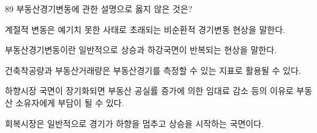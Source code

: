 \begin{question}{89}
부동산경기변동에 관한 설명으로 옳지 않은 것은?
\begin{choices}
  \item 계절적 변동은 예기치 못한 사태로 초래되는 비순환적 경기변동 현상을 말한다.
  \item 부동산경기변동이란 일반적으로 상승과 하강국면이 반복되는 현상을 말한다.
  \item 건축착공량과 부동산거래량은 부동산경기를 측정할 수 있는 지표로 활용될 수 있다.
  \item 하향시장 국면이 장기화되면 부동산 공실률 증가에 의한 임대료 감소 등의 이유로 부동산 소유자에게 부담이 될 수 있다.
  \item 회복시장은 일반적으로 경기가 하향을 멈추고 상승을 시작하는 국면이다.
\end{choices}
\end{question}
